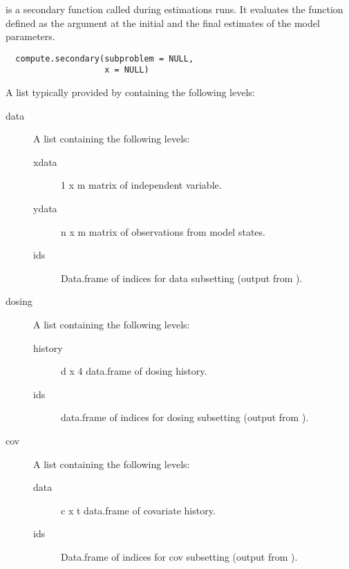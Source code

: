 %
\begin{Description}\relax
{} is a secondary function called during estimations
runs. It evaluates the function defined as the 
argument at the initial and the final estimates of the model parameters.
\end{Description}
%
\begin{Usage}
\begin{verbatim}
  compute.secondary(subproblem = NULL,
                    x = NULL)
\end{verbatim}
\end{Usage}
%
\begin{Arguments}
\begin{ldescription}
\item[\code{subproblem}] A list typically provided by  containing
the following levels:\begin{description}

\item[data] A list containing the following levels:\begin{description}

\item[xdata] 1 x m matrix of independent variable.
\item[ydata] n x m matrix of observations from model states.
\item[ids] Data.frame of indices for data subsetting (output
from ).

\end{description}

\item[dosing] A list containing the following levels:\begin{description}

\item[history] d x 4 data.frame of dosing history.
\item[ids] data.frame of indices for dosing subsetting
(output from ).

\end{description}

\item[cov] A list containing the following levels:\begin{description}

\item[data] c x t data.frame of covariate history.
\item[ids] Data.frame of indices for cov subsetting (output
from ).


\end{description}
\end{description}
\end{ldescription}
\end{Arguments}
